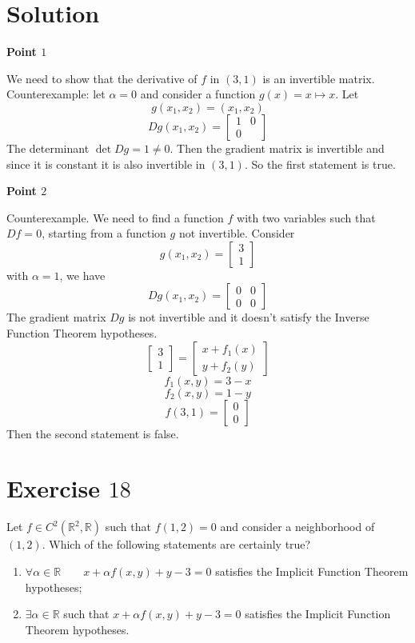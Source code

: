 \documentclass[a4paper, twoside, openany]{book}
\begin{document}
\section*{Solution}
\textbf{Point $1$} \par 
We need to show that the derivative of $f$ in $(3, 1)$ is an invertible matrix. Counterexample: let $\alpha = 0$ and consider a function $g(x) = x \mapsto x$. Let
$$g(x_1, x_2) = (x_1, x_2)$$
$$Dg(x_1, x_2) = \begin{bmatrix}
					1 & 0 \\
					0 & \
				 \end{bmatrix}$$
The determinant $\det Dg = 1 \neq 0$. Then the gradient matrix is invertible
and since it is constant it is also invertible in $(3, 1)$. So the first statement is true. \par  
\textbf{Point $2$} \par   
Counterexample. We need to find a function $f$ with two variables such that $Df = 0$, starting from a function $g$ not invertible. Consider
$$g(x_1, x_2) = \begin{bmatrix}
					3 \\
					1
                \end{bmatrix}$$
with $\alpha = 1$, we have
$$Dg(x_1, x_2) = \begin{bmatrix}
					0 & 0 \\
					0 & 0
				\end{bmatrix}$$
The gradient matrix $Dg$ is not invertible and it doesn't satisfy the Inverse Function Theorem hypotheses.
$$\begin{bmatrix}
	3 \\
	1
\end{bmatrix} = \begin{bmatrix}
					x + f_1(x) \\
					y + f_2(y)
				\end{bmatrix}$$
$$f_1(x, y) = 3 - x$$
$$f_2(x, y) = 1 - y$$
$$f(3, 1) = \begin{bmatrix}
				0 \\
				0
			\end{bmatrix}$$
Then the second statement is false.
\clearpage
\section*{Exercise $18$}
Let $f \in C^2(\mathbb{R}^2, \mathbb{R})$ such that $f(1, 2) = 0$ and consider a neighborhood of $(1, 2)$. Which of the following statements are certainly true?
\begin{enumerate}
\item $\forall \alpha \in \mathbb{R} \qquad x + \alpha f(x, y) + y - 3 = 0$ satisfies the Implicit Function Theorem hypotheses;
\item $\exists \alpha \in \mathbb{R}$ such that $x + \alpha f(x, y) + y - 3 = 0$ satisfies the Implicit Function Theorem hypotheses.
\end{enumerate}
\end{document}
